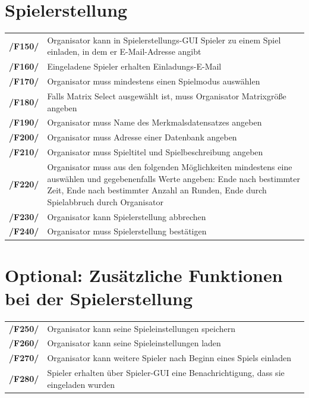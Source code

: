 \documentclass[a4paper]{scrreprt}
\begin{document}
    \section{Spielerstellung}
    \begin{tabularx}{\linewidth}{@{}>{\bfseries}l@{\hspace{.5em}}X@{}} 
    /F150/ & \Gls{Organisator} kann in Spielerstellungs-GUI \Gls{Spieler} zu einem Spiel einladen, in dem er E-Mail-Adresse angibt \\
    /F160/ & Eingeladene \Gls{Spieler} erhalten Einladungs-E-Mail \\
    /F170/ & \Gls{Organisator} muss mindestens einen \Gls{Spielmodus} auswählen \\
    /F180/ & Falls \Gls{Matrix Select} ausgewählt ist, muss \Gls{Organisator} Matrixgröße angeben \\
    /F190/ & \Gls{Organisator} muss Name des Merkmalsdatensatzes angeben \\
    /F200/ & \Gls{Organisator} muss Adresse einer Datenbank angeben \\ %
    /F210/ & \Gls{Organisator} muss Spieltitel und Spielbeschreibung angeben \\ %
    /F220/ & \Gls{Organisator} muss aus den folgenden Möglichkeiten mindestens eine auswählen und gegebenenfalls Werte angeben: Ende nach bestimmter Zeit, Ende nach bestimmter Anzahl an Runden, Ende durch Spielabbruch durch Organisator \\
    /F230/ & \Gls{Organisator} kann Spielerstellung abbrechen \\
    /F240/ & \Gls{Organisator} muss Spielerstellung bestätigen \\
    \end{tabularx}
    
    \section{Optional: Zusätzliche Funktionen bei der Spielerstellung}
    \begin{tabularx}{\linewidth}{@{}>{\bfseries}l@{\hspace{.5em}}X@{}}
    /F250/ & \Gls{Organisator} kann seine \Gls{Spieleinstellungen} speichern \\
    /F260/ & \Gls{Organisator} kann seine \Gls{Spieleinstellungen} laden \\
    /F270/ & \Gls{Organisator} kann weitere \Gls{Spieler} nach Beginn eines \Gls{Spiel}s einladen \\
    /F280/ & \Gls{Spieler} erhalten über Spieler-GUI eine Benachrichtigung, dass sie eingeladen wurden \\ %
	\end{tabularx}
    
\end{document}
